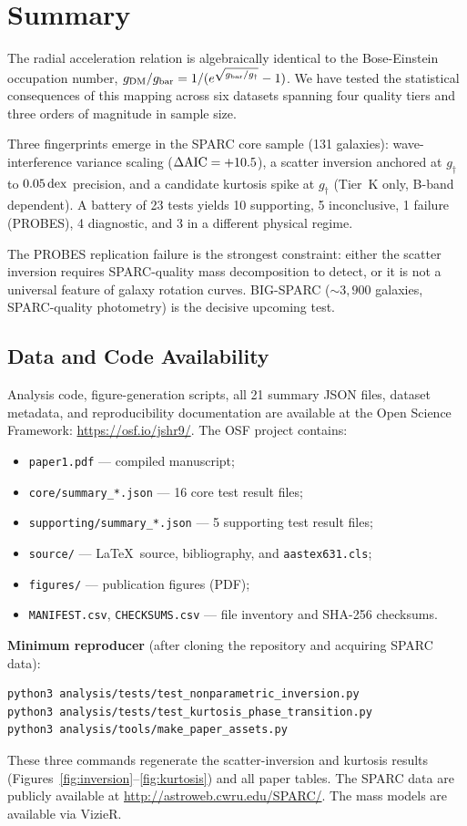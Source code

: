 \documentclass[twocolumn,twocolappendix]{aastex631}
\newcommand{\gbar}{g_{\rm bar}}
\newcommand{\gdm}{g_{\rm DM}}
\newcommand{\gdag}{g_{\dagger}}
\newcommand{\dex}{\,{\rm dex}}
\newcommand{\daic}{\Delta{\rm AIC}}
\begin{document}
\section{Summary} \label{sec:summary}

The radial acceleration relation is algebraically identical to the
Bose-Einstein occupation number,
$\gdm/\gbar = 1/(e^{\sqrt{\gbar/\gdag}} - 1)$. We have tested the
statistical consequences of this mapping across six datasets spanning four
quality tiers and three orders of magnitude in sample size.

Three fingerprints emerge in the SPARC core sample (131 galaxies):
wave-interference variance scaling ($\daic = +10.5$), a scatter inversion
anchored at $\gdag$ to $0.05\dex$ precision, and a candidate kurtosis spike
at $\gdag$ (Tier~K only, B-band dependent). A battery of 23 tests yields
10 supporting, 5 inconclusive, 1 failure (PROBES), 4 diagnostic, and 3 in
a different physical regime.

The PROBES replication failure is the strongest constraint: either the
scatter inversion requires SPARC-quality mass decomposition to detect, or
it is not a universal feature of galaxy rotation curves. BIG-SPARC
($\sim\!3{,}900$ galaxies, SPARC-quality photometry) is the decisive
upcoming test.

\subsection*{Data and Code Availability}

Analysis code, figure-generation scripts, all 21 summary JSON files, dataset
metadata, and reproducibility documentation are available at the Open Science
Framework: \url{https://osf.io/jshr9/}. The OSF project contains:
\begin{itemize}
    \item \texttt{paper1.pdf} --- compiled manuscript;
    \item \texttt{core/summary\_*.json} --- 16 core test result files;
    \item \texttt{supporting/summary\_*.json} --- 5 supporting test result
    files;
    \item \texttt{source/} --- \LaTeX\ source, bibliography, and
    \texttt{aastex631.cls};
    \item \texttt{figures/} --- publication figures (PDF);
    \item \texttt{MANIFEST.csv}, \texttt{CHECKSUMS.csv} --- file inventory
    and SHA-256 checksums.
\end{itemize}
\noindent\textbf{Minimum reproducer} (after cloning the repository and
acquiring SPARC data):
\begin{verbatim}
python3 analysis/tests/test_nonparametric_inversion.py
python3 analysis/tests/test_kurtosis_phase_transition.py
python3 analysis/tools/make_paper_assets.py
\end{verbatim}
\noindent These three commands regenerate the scatter-inversion and kurtosis
results (Figures~\ref{fig:inversion}--\ref{fig:kurtosis}) and all paper
tables. The SPARC data are publicly available at
\url{http://astroweb.cwru.edu/SPARC/}. The \citet{Korsaga2019} mass models
are available via VizieR.
\end{document}
